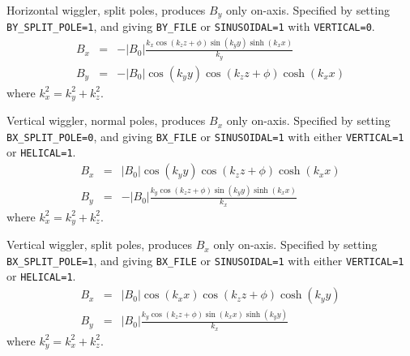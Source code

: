 Horizontal wiggler, split poles, produces $B_y$ only on-axis.   Specified
by setting {\tt BY\_SPLIT\_POLE=1}, and giving {\tt BY\_FILE} or {\tt SINUSOIDAL=1} with {\tt VERTICAL=0}.
\begin{eqnarray}
B_x & = & -\left|B_0\right| \frac{k_x \cos (k_z z + \phi) \sin (k_y y) \sinh (k_x x)}{k_y}\\
B_y & = & -\left|B_0\right| \cos (k_y y) \cos (k_z z + \phi) \cosh (k_x x)
\end{eqnarray}
where $k_x^2 = k_y^2 + k_z^2$.

Vertical wiggler, normal poles, produces $B_x$ only on-axis.   Specified
by setting {\tt BX\_SPLIT\_POLE=0}, and giving {\tt BX\_FILE} or {\tt SINUSOIDAL=1} with either {\tt VERTICAL=1} or
{\tt HELICAL=1}.
\begin{eqnarray}
B_x & = & \left|B_0\right| \cos (k_y y) \cos (k_z z + \phi) \cosh (k_x x)\\
B_y & = & -\left|B_0\right| \frac{k_y \cos (k_z z + \phi) \sin (k_y y) \sinh (k_x x)}{k_x}
\end{eqnarray}
where $k_x^2 = k_y^2 + k_z^2$.

Vertical wiggler, split poles, produces $B_x$ only on-axis.   Specified
by setting {\tt BX\_SPLIT\_POLE=1}, and giving {\tt BX\_FILE} or {\tt SINUSOIDAL=1} with either {\tt VERTICAL=1} or
{\tt HELICAL=1}.
\begin{eqnarray}
B_x & = & \left|B_0\right| \cos (k_x x) \cos (k_z z + \phi) \cosh (k_y y)\\
B_y & = & \left|B_0\right| \frac{k_y \cos (k_z z + \phi) \sin (k_x x) \sinh (k_y y)}{k_x}
\end{eqnarray}
where $k_y^2 = k_x^2 + k_z^2$.
